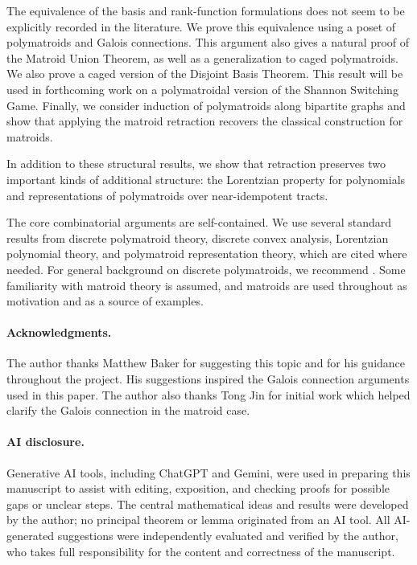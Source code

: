 \documentclass[11pt]{article}
\theoremstyle{definition}
\theoremstyle{remark}
\begin{document}
The equivalence of the basis and rank-function formulations does not seem to be explicitly recorded in the literature. We prove this equivalence using a poset of polymatroids and Galois connections. This argument also gives a natural proof of the Matroid Union Theorem, as well as a generalization to caged polymatroids. We also prove a caged version of the Disjoint Basis Theorem. This result will be used in forthcoming work on a polymatroidal version of the Shannon Switching Game. Finally, we consider induction of polymatroids along bipartite graphs and show that applying the matroid retraction recovers the classical construction for matroids.

In addition to these structural results, we show that retraction preserves two important kinds of additional structure: the Lorentzian property for polynomials and representations of polymatroids over near-idempotent tracts.

The core combinatorial arguments are self-contained. We use several
standard results from discrete polymatroid theory, discrete convex
analysis, Lorentzian polynomial theory, and polymatroid representation
theory, which are cited where needed. For general background on
discrete polymatroids, we recommend
\cite{herzog2003discretepolymatroids}. Some familiarity with matroid
theory is assumed, and matroids are used throughout as motivation and
as a source of examples.

\paragraph*{Acknowledgments.}
The author thanks Matthew Baker for suggesting this topic and for his guidance throughout the project. His suggestions inspired the Galois connection arguments used in this paper. The author also thanks Tong Jin for initial work which helped clarify the Galois connection in the matroid case.

\paragraph*{AI disclosure.}
Generative AI tools, including ChatGPT and Gemini, were used in preparing
this manuscript to assist with editing, exposition, and checking proofs for
possible gaps or unclear steps. The central mathematical ideas and results
were developed by the author; no principal theorem or lemma originated from
an AI tool. All AI-generated suggestions were independently evaluated and
verified by the author, who takes full responsibility for the content and
correctness of the manuscript.
\end{document}
